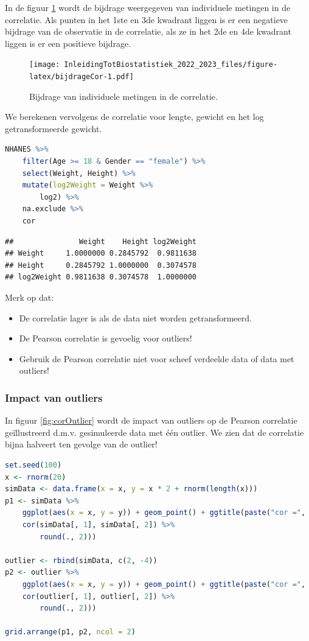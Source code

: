 \documentclass[
  12pt,dutch,coursenotes]{book}
\providecommand{\tightlist}{%
  \setlength{\itemsep}{0pt}\setlength{\parskip}{0pt}}
\begin{document}
In de figuur \ref{fig:bijdrageCor} wordt de bijdrage weergegeven van individuele metingen in de correlatie. Als punten in het 1ste en 3de kwadrant liggen is er een negatieve bijdrage van de observatie in de correlatie, als ze in het 2de en 4de kwadrant liggen is er een positieve bijdrage.

\begin{figure}
\centering
\texttt{[image: InleidingTotBiostatistiek\_2022\_2023\_files/figure-latex/bijdrageCor-1.pdf]}
\caption{\label{fig:bijdrageCor}Bijdrage van individuele metingen in de correlatie.}
\end{figure}

We berekenen vervolgens de correlatie voor lengte, gewicht en het log getransformeerde gewicht.

\begin{lstlisting}[language=R]
NHANES %>%
    filter(Age >= 18 & Gender == "female") %>%
    select(Weight, Height) %>%
    mutate(log2Weight = Weight %>%
        log2) %>%
    na.exclude %>%
    cor
\end{lstlisting}

\begin{lstlisting}
##               Weight    Height log2Weight
## Weight     1.0000000 0.2845792  0.9811638
## Height     0.2845792 1.0000000  0.3074578
## log2Weight 0.9811638 0.3074578  1.0000000
\end{lstlisting}

Merk op dat:

\begin{itemize}
\tightlist
\item
  De correlatie lager is als de data niet worden getransformeerd.
\item
  De Pearson correlatie is gevoelig voor outliers!
\item
  Gebruik de Pearson correlatie niet voor scheef verdeelde data of data met outliers!
\end{itemize}

\hypertarget{impact-van-outliers}{%
\subsubsection{Impact van outliers}\label{impact-van-outliers}}

In figuur \ref{fig:corOutlier} wordt de impact van outliers op de Pearson correlatie geïllustreerd d.m.v. gesimuleerde data met één outlier. We zien dat de correlatie bijna halveert ten gevolge van de outlier!

\begin{lstlisting}[language=R]
set.seed(100)
x <- rnorm(20)
simData <- data.frame(x = x, y = x * 2 + rnorm(length(x)))
p1 <- simData %>%
    ggplot(aes(x = x, y = y)) + geom_point() + ggtitle(paste("cor =",
    cor(simData[, 1], simData[, 2]) %>%
        round(., 2)))

outlier <- rbind(simData, c(2, -4))
p2 <- outlier %>%
    ggplot(aes(x = x, y = y)) + geom_point() + ggtitle(paste("cor =",
    cor(outlier[, 1], outlier[, 2]) %>%
        round(., 2)))

grid.arrange(p1, p2, ncol = 2)
\end{lstlisting}
\end{document}
